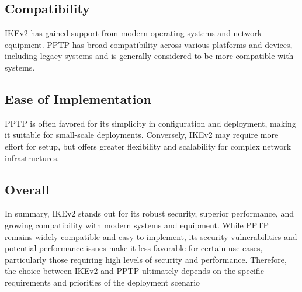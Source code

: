\documentclass[runningheads]{llncs}
\begin{document}
\subsection{Compatibility}
IKEv2 has gained support from modern operating systems and network equipment. PPTP has broad compatibility across various platforms and devices, including legacy systems and is generally considered to be more compatible with systems.
\subsection{Ease of Implementation}
PPTP is often favored for its simplicity in configuration and deployment, making it suitable for small-scale deployments. Conversely, IKEv2 may require more effort for setup, but offers greater flexibility and scalability for complex network infrastructures.
\subsection{Overall}
In summary, IKEv2 stands out for its robust security, superior performance, and growing compatibility with modern systems and equipment. While PPTP remains widely compatible and easy to implement, its security vulnerabilities and potential performance issues make it less favorable for certain use cases, particularly those requiring high levels of security and performance. Therefore, the choice between IKEv2 and PPTP ultimately depends on the specific requirements and priorities of the deployment scenario



\end{document}
